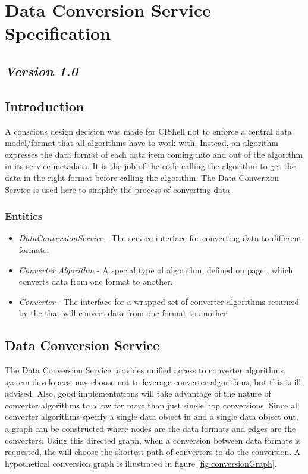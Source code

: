 \chapter{Data Conversion Service Specification}
\section*{\textit{Version 1.0}}
\section{Introduction}

A conscious design decision was made for CIShell not to enforce a central data
model/format that all algorithms have to work with. Instead, an algorithm
expresses the data format of each data item coming into and out of the algorithm
in its service metadata. It is the job of the code calling the algorithm to get
the data in the right format before calling the algorithm. The Data Conversion
Service is used here to simplify the process of converting data.

\subsection{Entities}

\begin{itemize}
  \item \textit{DataConversionService} - The service interface for converting
  data to different formats.
  \item \textit{Converter Algorithm} - A special type of algorithm, defined
  on page \pageref{converterAlg}, which converts data from one format to
  another.
  \item \textit{Converter} - The interface for a wrapped set of converter
  algorithms returned by the  that will convert
  data from one format to another.
\end{itemize}

\section{Data Conversion Service}

The Data Conversion Service provides unified access to converter algorithms.
 system developers may choose not to leverage
converter algorithms, but this is ill-advised. Also, good implementations will
take advantage of the nature of converter algorithms to allow for more than just
single hop conversions. Since all converter algorithms specify a single data
object in and a single data object out, a graph can be constructed where nodes
are the data formats and edges are the converters. Using this directed graph,
when a conversion between data formats is requested, the
 will choose the shortest path of converters to do
the conversion. A hypothetical conversion graph is illustrated in figure
\ref{fig:conversionGraph}.

